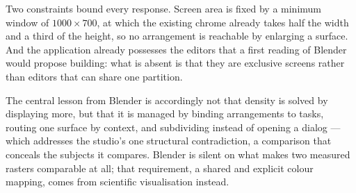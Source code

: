 \documentclass[11pt,a4paper]{article}
\begin{document}
Two constraints bound every response. Screen area is fixed by a minimum window
of $1000 \times 700$, at which the existing chrome already takes half the width
and a third of the height, so no arrangement is reachable by enlarging a
surface. And the application already possesses the editors that a first reading
of Blender would propose building: what is absent is that they are exclusive
screens rather than editors that can share one partition.

The central lesson from Blender is accordingly not that density is solved by
displaying more, but that it is managed by binding arrangements to tasks,
routing one surface by context, and subdividing instead of opening a dialog ---
which addresses the studio's one structural contradiction, a comparison that
conceals the subjects it compares. Blender is silent on what makes two measured
rasters comparable at all; that requirement, a shared and explicit colour
mapping, comes from scientific visualisation instead.
\end{document}
